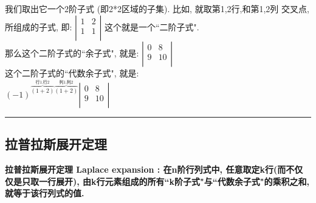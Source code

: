 \documentclass[UTF8]{ctexart}
\begin{document}
我们取出它一个2阶子式 (即2*2区域的子集). 比如, 就取第1,2行,和第1,2列 交叉点, 所组成的子式, 即:
$
\left| \begin{matrix}
	1&		2\\
	1&		1\\
\end{matrix} \right|
$
	这个就是一个``二阶子式". \\
	
	那么这个二阶子式的``余子式", 就是:
$
\left| \begin{matrix}
	0&		8\\
	9&		10\\
\end{matrix} \right|
$	\\




这个二阶子式的``代数余子式", 就是: \\
$
\left( -1 \right) ^{\overset{\text{行1,行}2}{\overbrace{\left( 1+2 \right) }}\overset{\text{列1,列}2}{\overbrace{\left( 1+2 \right) }}}\left| \begin{matrix}
	0&		8\\
	9&		10\\
\end{matrix} \right|
$ \\

	

	\hrule

	\subsection{拉普拉斯展开定理}
	
	\textbf{拉普拉斯展开定理 Laplace expansion : 在n阶行列式中, 任意取定k行(而不仅仅是只取一行展开), 由k行元素组成的所有``k阶子式"与``代数余子式"的乘积之和, 就等于该行列式的值.} \\
	
\end{document}
